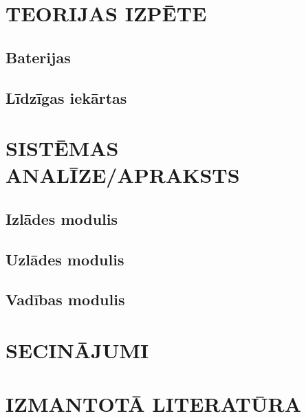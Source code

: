 \documentclass[12pt,fleqn,titlepage,oneside]{article}
\numberwithin{equation}{section}
\numberwithin{figure}{section}
\numberwithin{table}{section}
\begin{document}
\FloatBarrier
\newpage
\section{\texorpdfstring{\MakeUppercase{Teorijas izpēte}}{Teorijas izpēte}}

\subsection{Baterijas}

\subsection{Līdzīgas iekārtas}

\FloatBarrier
\newpage
\section{\texorpdfstring{\MakeUppercase{Sistēmas analīze/apraksts}}{Sistēmas analīze/apraksts}}

\subsection{Izlādes modulis}

\subsection{Uzlādes modulis}

\subsection{Vadības modulis}

\FloatBarrier
\newpage
\section{\texorpdfstring{\MakeUppercase{Secinājumi}}{Secinājumi}}

\FloatBarrier
\newpage
\section{\texorpdfstring{\MakeUppercase{Izmantotā literatūra}}{Izmantotā literatūra}}
\end{document}
